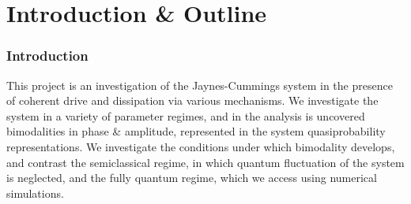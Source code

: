 \part{Introduction \& Outline}
\section{Introduction}
  This project is an investigation of the Jaynes-Cummings system in the presence of coherent drive and dissipation via various mechanisms. We investigate the system in a variety of parameter regimes, and in the analysis is uncovered bimodalities in phase \& amplitude, represented in the system quasiprobability representations. We investigate the conditions under which bimodality develops, and contrast the semiclassical regime, in which quantum fluctuation of the system is neglected, and the fully quantum regime, which we access using numerical simulations.

